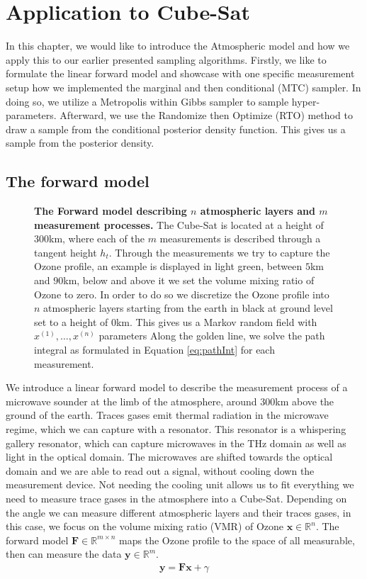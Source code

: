 \chapter{Application to Cube-Sat}
\label{ch:3-application}
In this chapter, we would like to introduce the Atmospheric model and how we apply this to our earlier presented sampling algorithms.
Firstly, we like to formulate the linear forward model and showcase with one specific measurement setup how we implemented the marginal and then conditional (MTC) sampler.
In doing so, we utilize a Metropolis within Gibbs sampler to sample hyper-parameters.
Afterward, we use the Randomize then Optimize (RTO) method to draw a sample from the conditional posterior density function.
This gives us a sample from the  posterior density.

\section{The forward model}
\label{subsec:atmosModel}
\begin{figure}[thb!]
\centering 
\caption[The Forward model describing $n$ atmospheric layers and $m$ measurement processes.]{\textbf{The Forward model describing $n$ atmospheric layers and $m$ measurement processes.} The Cube-Sat is located at a height of $300$km, where each of the $m$ measurements is described through a tangent height $h_t$. Through the measurements we try to capture the Ozone profile, an example is displayed in light green, between $5$km and $90$km, below and above it we set the volume mixing ratio of Ozone to zero.
In order to do so we discretize the Ozone profile into $n$ atmospheric layers starting from the earth in black at ground level set to a height of $0$km.
This gives us a Markov random field with $x^{(1)}, \dots, x^{(n)}$ parameters
Along the golden line, we solve the path integral as formulated in Equation \ref{eq:pathInt} for each measurement.}
\label{fig:forModel}
\end{figure}
We introduce a linear forward model to describe the measurement process of a microwave sounder at the limb of the atmosphere, around $300$km above the ground of the earth.
Traces gases emit thermal radiation in the microwave regime, which we can capture with a resonator.
This resonator is a whispering gallery resonator, which can capture microwaves in the THz domain as well as light in the optical domain.
The microwaves are shifted towards the optical domain and we are able to read out a signal, without cooling down the measurement device.
Not needing the cooling unit allows us to fit everything we need to measure trace gases in the atmosphere into a Cube-Sat.
Depending on the angle we can measure different atmospheric layers and their traces gases, in this case, we focus on the volume mixing ratio (VMR) of Ozone $\bm{x} \in \mathbb{R}^n$.
The forward model $ \bm{F} \in \mathbb{R}^{m \times n}$  maps the Ozone profile to the space of all measurable, then can measure the data $\bm{y} \in \mathbb{R}^m$.
\begin{align}
   \bm{y} =  \bm{F}  \bm{x} + \gamma
\end{align} 

